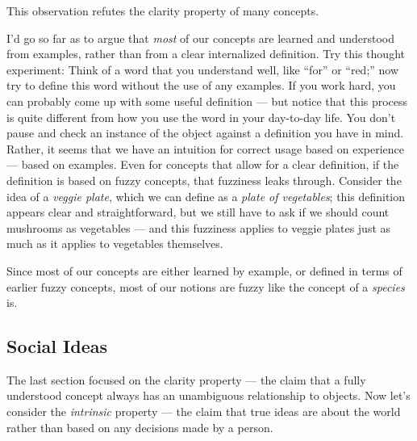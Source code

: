 \documentclass[11pt, oneside]{article}
\theoremstyle{argtstyle}
\begin{document}
This observation refutes the clarity property of many concepts.

I'd go so far as to argue that {\em most} of our concepts are learned and
understood from examples, rather than from a clear internalized definition.
Try this thought experiment: Think of a word that you understand well, like
``for'' or ``red;'' now try to define this word without the use of any examples.
If you work hard, you can probably come up with some useful definition --- but
notice that this process is quite different from how you use the word in your
day-to-day life. You don't pause and check an instance of the object against a
definition you have in mind. Rather, it seems that we have an intuition for
correct usage based on experience --- based on examples.
Even for concepts that allow for a clear definition, if the definition is based
on fuzzy concepts, that fuzziness leaks through. Consider the idea of a {\em
veggie plate}, which we can define as a {\em plate of vegetables}; this
definition appears clear and straightforward, but we still have to ask if we
should count mushrooms as vegetables --- and this fuzziness applies to veggie
plates just as much as it applies to vegetables themselves.

Since most of our concepts are either learned by example, or defined in terms of
earlier fuzzy concepts,
most of our notions are fuzzy like the concept of a {\em species} is.

\subsection{Social Ideas}

%
%

The last section focused on the clarity property --- the claim that a fully
understood
concept always has an unambiguous relationship to objects.
Now let's
consider the {\em intrinsic} property --- the claim that true ideas are about
the world
rather
than based on any decisions made by a person.
\end{document}
